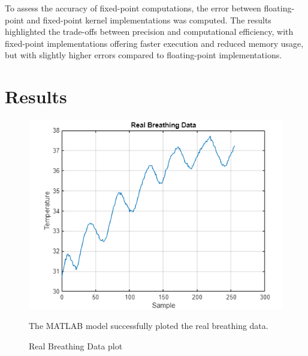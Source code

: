 \documentclass[journal]{IEEEtran}
\begin{document}
To assess the accuracy of fixed-point computations, the error between floating-point and fixed-point kernel implementations was computed. The results highlighted the trade-offs between precision and computational efficiency, with fixed-point implementations offering faster execution and reduced memory usage, but with slightly higher errors compared to floating-point implementations.

\section{Results}

\begin{figure}[H]
    \centering
    \includegraphics[width=\linewidth]{1.1.png}
    \caption{Real Breathing Data plot}
    \begin{minipage}{\linewidth}
        The MATLAB model successfully ploted the real breathing data. 
    \end{minipage}
    \label{fig:part1}
\end{figure}
\end{document}
